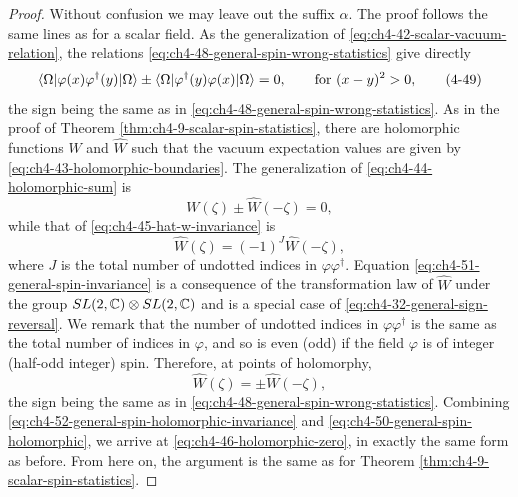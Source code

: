 \begin{proof}

Without confusion we may leave out the suffix $\alpha$.  The proof follows the
same lines as for a scalar field.  As the generalization of \eqref{eq:ch4-42-scalar-vacuum-relation}, the
relations \eqref{eq:ch4-48-general-spin-wrong-statistics} give directly
\begin{equation}
  \langle \Omega\rvert\varphi(x)\varphi^\dagger(y)\lvert \Omega\rangle
  \mathbin{\pm}
  \langle \Omega\rvert\varphi^\dagger(y)\varphi(x)\lvert \Omega\rangle=0,
  \qquad\text{for }(x-y)^2>0,
  \tag{4-49}\label{eq:ch4-49-general-spin-vacuum}
\end{equation}
the sign being the same as in \eqref{eq:ch4-48-general-spin-wrong-statistics}.  As in the proof of Theorem \ref{thm:ch4-9-scalar-spin-statistics}, there
are holomorphic functions $W$ and $\widehat W$ such that the vacuum expectation
values are given by \eqref{eq:ch4-43-holomorphic-boundaries}.  The generalization of \eqref{eq:ch4-44-holomorphic-sum} is
\begin{equation}
  W(\zeta)\mathbin{\pm}\widehat W(-\zeta)=0,
  \tag{4-50}\label{eq:ch4-50-general-spin-holomorphic}
\end{equation}
while that of \eqref{eq:ch4-45-hat-w-invariance} is
\begin{equation}
  \widehat W(\zeta)=(-1)^J\widehat W(-\zeta),
  \tag{4-51}\label{eq:ch4-51-general-spin-invariance}
\end{equation}
where $J$ is the total number of undotted indices in $\varphi\varphi^\dagger$.
Equation \eqref{eq:ch4-51-general-spin-invariance} is a consequence of the transformation law of $\widehat W$
under the group $SL(2,\mathbb{C})\otimes SL(2,\mathbb{C})$ and is a special case of \eqref{eq:ch4-32-general-sign-reversal}.
We remark that the number of undotted indices in $\varphi\varphi^\dagger$ is
the same as the total number of indices in $\varphi$, and so is even (odd) if
the field $\varphi$ is of integer (half-odd integer) spin.  Therefore, at
points of holomorphy,
\begin{equation}
  \widehat W(\zeta)=\mathbin{\pm}\widehat W(-\zeta),
  \tag{4-52}\label{eq:ch4-52-general-spin-holomorphic-invariance}
\end{equation}
the sign being the same as in \eqref{eq:ch4-48-general-spin-wrong-statistics}.  Combining \eqref{eq:ch4-52-general-spin-holomorphic-invariance} and \eqref{eq:ch4-50-general-spin-holomorphic}, we arrive
at \eqref{eq:ch4-46-holomorphic-zero}, in exactly the same form as before.  From here on, the argument is
the same as for Theorem \ref{thm:ch4-9-scalar-spin-statistics}.
\end{proof}

